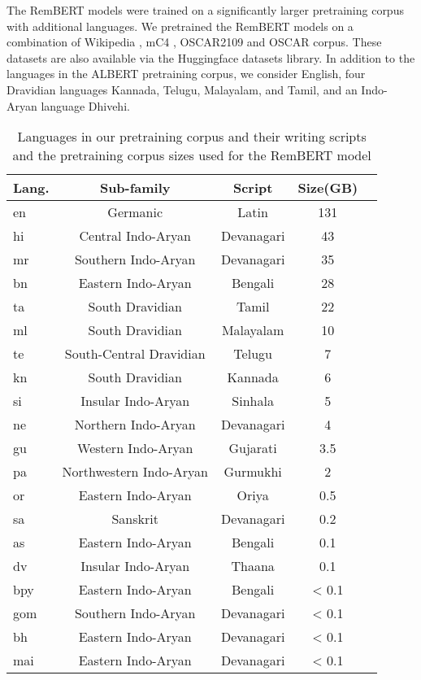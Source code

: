 \documentclass[11pt]{article}
\begin{document}
The RemBERT models were trained on a significantly larger pretraining corpus with additional languages. We pretrained the RemBERT models on a combination of Wikipedia \citep{wikidump}, mC4 \citep{2019t5}, OSCAR2109 \citep{AbadjiOrtizSuarezRomaryetal.2021} and OSCAR corpus. These datasets are also available via the Huggingface datasets library. In addition to the languages in the ALBERT pretraining corpus, we consider English, four Dravidian languages Kannada, Telugu, Malayalam, and Tamil, and an Indo-Aryan language Dhivehi. 
\begin{table}[hbt!]
\begin{center}
\begin{adjustbox}{max width=.45\textwidth}
\small
\begin{tabular}{l c c c c}
\\ \hline 
\textbf{Lang.} & \textbf{Sub-family} & \textbf{Script} & \textbf{Size(GB)}\\
\hline 
en & Germanic & Latin & 131\\
hi & Central Indo-Aryan & Devanagari & 43\\
mr & Southern Indo-Aryan & Devanagari & 35\\
bn & Eastern Indo-Aryan & Bengali & 28\\
ta & South Dravidian & Tamil & 22\\
ml & South Dravidian & Malayalam & 10\\
te & South-Central Dravidian  & Telugu & 7\\
kn & South Dravidian & Kannada & 6\\
si & Insular Indo-Aryan & Sinhala & 5\\
ne & Northern Indo-Aryan & Devanagari & 4\\
gu & Western Indo-Aryan & Gujarati & 3.5\\
pa & Northwestern Indo-Aryan & Gurmukhi & 2\\
or & Eastern Indo-Aryan & Oriya & 0.5\\
sa & Sanskrit & Devanagari & 0.2\\
as & Eastern Indo-Aryan & Bengali & 0.1\\
dv & Insular Indo-Aryan & Thaana & 0.1\\
bpy & Eastern Indo-Aryan & Bengali & < 0.1\\
gom & Southern Indo-Aryan & Devanagari & < 0.1\\
bh & Eastern Indo-Aryan & Devanagari & < 0.1\\
mai & Eastern Indo-Aryan & Devanagari & < 0.1\\
\hline 
\end{tabular}
\end{adjustbox}
\caption{Languages in our pretraining corpus and their writing scripts and the pretraining corpus sizes used for the RemBERT model}
\label{table-pr-dt}
\end{center}
\end{table}
\end{document}
